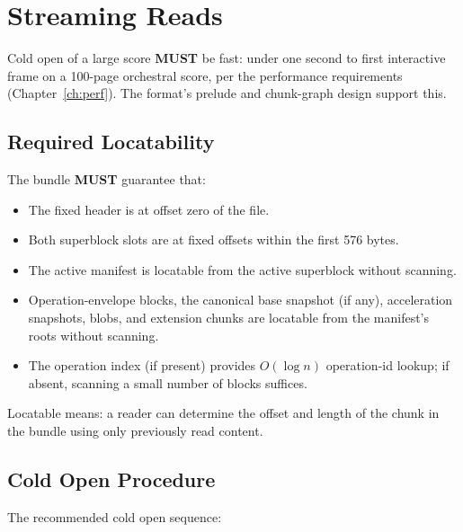 \documentclass[11pt,letterpaper]{report}
\newcounter{requirement}[chapter]
\newcommand{\MUST}{\textbf{MUST}}
\begin{document}
\section{Streaming Reads}
\label{sec:format:streaming}

Cold open of a large score \MUST{} be fast: under one second to
first interactive frame on a 100-page orchestral score, per the
performance requirements (Chapter~\ref{ch:perf}). The format's
prelude and chunk-graph design support this.

\subsection{Required Locatability}

\begin{requirement}
  \label{req:format:chunk-locatability}
  The bundle \MUST{} guarantee that:

  \begin{itemize}
    \item The fixed header is at offset zero of the file.
    \item Both superblock slots are at fixed offsets within the
      first 576 bytes.
    \item The active manifest is locatable from the active
      superblock without scanning.
    \item Operation-envelope blocks, the canonical base snapshot
      (if any), acceleration snapshots, blobs, and extension
      chunks are locatable from the manifest's roots without
      scanning.
    \item The operation index (if present) provides $O(\log n)$
      operation-id lookup; if absent, scanning a small number of
      blocks suffices.
  \end{itemize}

  Locatable means: a reader can determine the offset and length of
  the chunk in the bundle using only previously read content.
\end{requirement}

\subsection{Cold Open Procedure}

The recommended cold open sequence:
\end{document}
